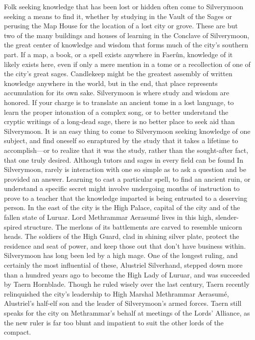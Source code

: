 \documentclass[10pt,a4paper,twoside,twocolumn,openany,bg=print,nodeprecatedcode]{dndbook}
\begin{document}
Folk seeking knowledge that has been lost or hidden often come to Silverymoon seeking a means to find it, whether by studying in the Vault of the Sages or perusing the Map House for the location of a lost city or grove. These are but two of the many buildings and houses of learning in the Conclave of Silverymoon, the great center of knowledge and wisdom that forms much of the city's southern part. If a map, a book, or a spell exists anywhere in Faerûn, knowledge of it likely exists here, even if only a mere mention in a tome or a recollection of one of the city's great sages. Candlekeep might be the greatest assembly of written knowledge anywhere in the world, but in the end, that place represents accumulation for its own sake. Silverymoon is where study and wisdom are honored. If your charge is to translate an ancient tome in a lost language, to learn the proper intonation of a complex song, or to better understand the cryptic writings of a long-dead sage, there is no better place to seek aid than Silverymoon.
It is an easy thing to come to Silverymoon seeking knowledge of one subject, and find oneself so enraptured by the study that it takes a lifetime to accomplish—or to realize that it was the study, rather than the sought-after fact, that one truly desired. Although tutors and sages in every field can be found In Silverymoon, rarely is interaction with one so simple as to ask a question and be provided an answer. Learning to cast a particular spell, to find an ancient ruin, or understand a specific secret might involve undergoing months of instruction to prove to a teacher that the knowledge imparted is being entrusted to a deserving person.
In the east of the city is the High Palace, capital of the city and of the fallen state of Luruar. Lord Methrammar Aerasumé lives in this high, slender-spired structure. The merlons of its battlements are carved to resemble unicorn heads. The soldiers of the High Guard, clad in shining silver plate, protect the residence and seat of power, and keep those out that don't have business within.
Silverymoon has long been led by a high mage. One of the longest ruling, and certainly the most influential of these, Alustriel Silverhand, stepped down more than a hundred years ago to become the High Lady of Luruar, and was succeeded by Taern Hornblade. Though he ruled wisely over the last century, Taern recently relinquished the city's leadership to High Marshal Methrammar Aerasumé, Alustriel's half-elf son and the leader of Silverymoon's armed forces. Taern still speaks for the city on Methrammar's behalf at meetings of the Lords' Alliance, as the new ruler is far too blunt and impatient to suit the other lords of the compact.
\end{document}
